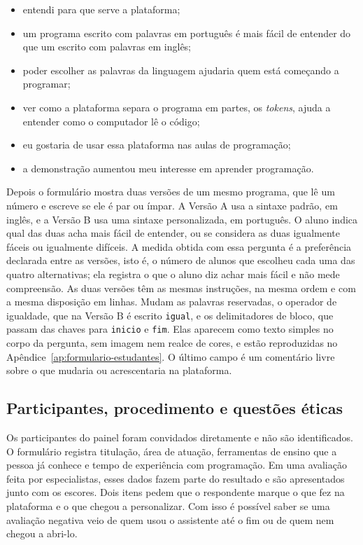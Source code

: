 \begin{itemize}
    \item entendi para que serve a plataforma;
    \item um programa escrito com palavras em português é mais fácil de entender do que um escrito com palavras em inglês;
    \item poder escolher as palavras da linguagem ajudaria quem está começando a programar;
    \item ver como a plataforma separa o programa em partes, os \textit{tokens}, ajuda a entender como o computador lê o código;
    \item eu gostaria de usar essa plataforma nas aulas de programação;
    \item a demonstração aumentou meu interesse em aprender programação.
\end{itemize}
 Depois o formulário mostra duas versões de um mesmo programa, que lê um número e escreve se ele é par ou ímpar. A Versão A usa a sintaxe padrão, em inglês, e a Versão B usa uma sintaxe personalizada, em português. O aluno indica qual das duas acha mais fácil de entender, ou se considera as duas igualmente fáceis ou igualmente difíceis. A medida obtida com essa pergunta é a preferência declarada entre as versões, isto é, o número de alunos que escolheu cada uma das quatro alternativas; ela registra o que o aluno diz achar mais fácil e não mede compreensão. As duas versões têm as mesmas instruções, na mesma ordem e com a mesma disposição em linhas. Mudam as palavras reservadas, o operador de igualdade, que na Versão B é escrito \texttt{igual}, e os delimitadores de bloco, que passam das chaves para \texttt{inicio} e \texttt{fim}. Elas aparecem como texto simples no corpo da pergunta, sem imagem nem realce de cores, e estão reproduzidas no Apêndice~\ref{ap:formulario-estudantes}. O último campo é um comentário livre sobre o que mudaria ou acrescentaria na plataforma.

\subsection{Participantes, procedimento e questões éticas}

Os participantes do painel foram convidados diretamente e não são identificados. O formulário registra titulação, área de atuação, ferramentas de ensino que a pessoa já conhece e tempo de experiência com programação. Em uma avaliação feita por especialistas, esses dados fazem parte do resultado e são apresentados junto com os escores. Dois itens pedem que o respondente marque o que fez na plataforma e o que chegou a personalizar. Com isso é possível saber se uma avaliação negativa veio de quem usou o assistente até o fim ou de quem nem chegou a abri-lo.

